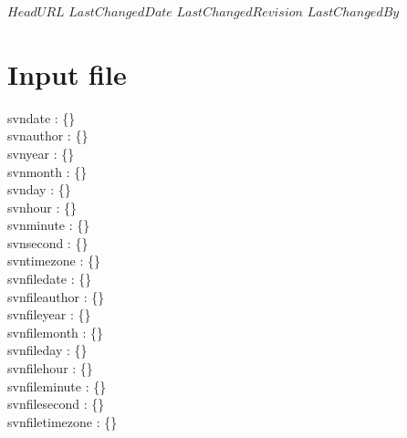 \svnidlong
{$HeadURL$}
{$LastChangedDate$}
{$LastChangedRevision$}
{$LastChangedBy$}

\section{Input file}

\noindent
 svndate : \{\svndate\} \\
 svnauthor : \{\svnauthor\} \\
 svnyear : \{\svnyear\} \\
 svnmonth : \{\svnmonth\} \\
 svnday : \{\svnday\} \\
 svnhour : \{\svnhour\} \\
 svnminute : \{\svnminute\} \\
 svnsecond : \{\svnsecond\} \\
 svntimezone : \{\svntimezone\} \\

\noindent
 svnfiledate : \{\svnfiledate\} \\
 svnfileauthor : \{\svnfileauthor\} \\
 svnfileyear : \{\svnfileyear\} \\
 svnfilemonth : \{\svnfilemonth\} \\
 svnfileday : \{\svnfileday\} \\
 svnfilehour : \{\svnfilehour\} \\
 svnfileminute : \{\svnfileminute\} \\
 svnfilesecond : \{\svnfilesecond\} \\
 svnfiletimezone : \{\svnfiletimezone\} \\

